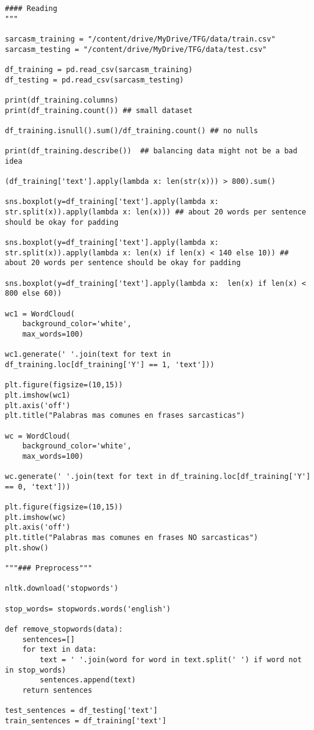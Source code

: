 \documentclass[10pt,riqno,a4paper,twoside]{article}\usepackage[]{graphicx}\usepackage[]{color}
\begin{document}
\begin{lstlisting}
#### Reading
"""

sarcasm_training = "/content/drive/MyDrive/TFG/data/train.csv"
sarcasm_testing = "/content/drive/MyDrive/TFG/data/test.csv"

df_training = pd.read_csv(sarcasm_training)
df_testing = pd.read_csv(sarcasm_testing)

print(df_training.columns)
print(df_training.count()) ## small dataset

df_training.isnull().sum()/df_training.count() ## no nulls

print(df_training.describe())  ## balancing data might not be a bad idea

(df_training['text'].apply(lambda x: len(str(x))) > 800).sum()

sns.boxplot(y=df_training['text'].apply(lambda x: str.split(x)).apply(lambda x: len(x))) ## about 20 words per sentence should be okay for padding

sns.boxplot(y=df_training['text'].apply(lambda x: str.split(x)).apply(lambda x: len(x) if len(x) < 140 else 10)) ## about 20 words per sentence should be okay for padding

sns.boxplot(y=df_training['text'].apply(lambda x:  len(x) if len(x) < 800 else 60))

wc1 = WordCloud(
    background_color='white', 
    max_words=100)

wc1.generate(' '.join(text for text in df_training.loc[df_training['Y'] == 1, 'text']))

plt.figure(figsize=(10,15))
plt.imshow(wc1)
plt.axis('off')
plt.title("Palabras mas comunes en frases sarcasticas")

wc = WordCloud(
    background_color='white', 
    max_words=100)

wc.generate(' '.join(text for text in df_training.loc[df_training['Y'] == 0, 'text']))

plt.figure(figsize=(10,15))
plt.imshow(wc)
plt.axis('off')
plt.title("Palabras mas comunes en frases NO sarcasticas")
plt.show()

"""### Preprocess"""

nltk.download('stopwords')

stop_words= stopwords.words('english')

def remove_stopwords(data):
    sentences=[]
    for text in data:
        text = ' '.join(word for word in text.split(' ') if word not in stop_words)
        sentences.append(text)
    return sentences

test_sentences = df_testing['text']
train_sentences = df_training['text']


\end{lstlisting}
\end{document}
